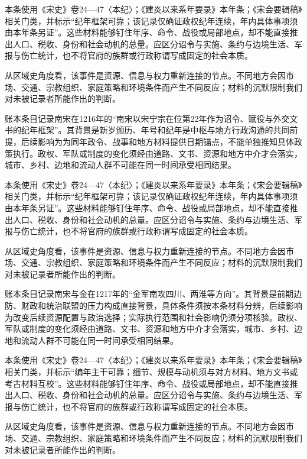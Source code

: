 本条使用《宋史》卷24—47〈本纪〉；《建炎以来系年要录》本年条；《宋会要辑稿》相关门类，并标示“纪年框架可靠；该记录仅确证政权纪年连续，年内具体事项须由本年条另证”。这些材料能够钉住年序、命令、战役或局部地点，却不能直接推出人口、税收、身份和社会动机的总量。应区分诏令与实施、条约与边境生活、军报与伤亡统计，也不将官府的族群或行政称谓写成固定的社会本质。

从区域史角度看，该事件是资源、信息与权力重新连接的节点。不同地方会因市场、交通、宗教组织、家庭策略和环境条件而产生不同反应；材料的沉默限制我们对未被记录者所能作出的判断。

账本条目记录南宋在1216年的“南宋以宋宁宗在位第22年作为诏令、赋役与外交文书的纪年框架”。其背景是新岁颁历、年号和纪年是中枢与地方行政沟通的共同前提，后续影响为为同年政令、战事和地方材料提供日期锚点，不能单独推知具体政策执行。政权、军队或制度的变化须经由道路、文书、资源和地方中介才会落实，城市、乡村、边地和流动人群不可能在同一时间承受相同结果。

本条使用《宋史》卷24—47〈本纪〉；《建炎以来系年要录》本年条；《宋会要辑稿》相关门类，并标示“纪年框架可靠；该记录仅确证政权纪年连续，年内具体事项须由本年条另证”。这些材料能够钉住年序、命令、战役或局部地点，却不能直接推出人口、税收、身份和社会动机的总量。应区分诏令与实施、条约与边境生活、军报与伤亡统计，也不将官府的族群或行政称谓写成固定的社会本质。

从区域史角度看，该事件是资源、信息与权力重新连接的节点。不同地方会因市场、交通、宗教组织、家庭策略和环境条件而产生不同反应；材料的沉默限制我们对未被记录者所能作出的判断。

账本条目记录南宋与金在1217年的“金军南攻四川、两淮等方向”。其背景是前期边防、财政和统治联盟的压力构成直接背景，具体条件须按本条材料分辨，后续影响为改变后续资源配置与政治选择；实际执行范围和社会影响仍须分项核验。政权、军队或制度的变化须经由道路、文书、资源和地方中介才会落实，城市、乡村、边地和流动人群不可能在同一时间承受相同结果。

本条使用《宋史》卷24—47〈本纪〉；《建炎以来系年要录》本年条；《宋会要辑稿》相关门类，并标示“编年主干可靠；细节、规模与动机须与对方材料、地方文书或考古材料互校”。这些材料能够钉住年序、命令、战役或局部地点，却不能直接推出人口、税收、身份和社会动机的总量。应区分诏令与实施、条约与边境生活、军报与伤亡统计，也不将官府的族群或行政称谓写成固定的社会本质。

从区域史角度看，该事件是资源、信息与权力重新连接的节点。不同地方会因市场、交通、宗教组织、家庭策略和环境条件而产生不同反应；材料的沉默限制我们对未被记录者所能作出的判断。


